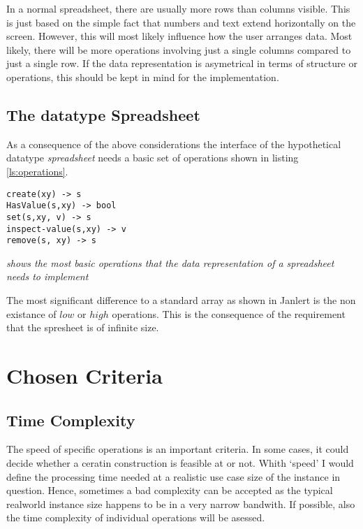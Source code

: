 \documentclass[a4paper,11pt,twoside]{article}
\begin{document}
In a normal spreadsheet, there are usually more rows than columns
visible. This is just based on the simple fact that numbers and text
extend horizontally on the screen. However, this will most likely
influence how the user arranges data. Most likely, there will be more
operations involving just a single columns compared to just a single
row. If the data representation is asymetrical in terms of structure
or operations, this should be kept in mind for the implementation. 

\subsection{The datatype Spreadsheet}
As a consequence of the above considerations the interface of the
hypothetical datatype \textit{spreadsheet} needs a basic set of
operations shown in listing \ref{ls:operations}. 

\begin{listing}
\begin{verbatim}
create(xy) -> s
HasValue(s,xy) -> bool
set(s,xy, v) -> s
inspect-value(s,xy) -> v
remove(s, xy) -> s
\end{verbatim}
\caption{\textit{shows the most basic operations that the data
  representation of a spreadsheet needs to implement \label{ls:operations}}}
\end{listing}

The most significant difference to a standard array as shown in
Janlert \cite[pp. 92-95]{janlert2000} is the non existance of $low$ or
$high$ operations. This is the consequence of the requirement that the
spresheet is of infinite size. 




\section{Chosen Criteria}
\subsection{Time Complexity}
The speed of specific operations is an important criteria. In some
cases, it could decide whether a ceratin construction is feasible at
or not. Whith `speed' I would define the processing time needed at a
realistic use case size of the instance in question. Hence, sometimes
a bad complexity can be accepted as the typical realworld instance
size happens to be in a very narrow bandwith. If possible, also the
time complexity of individual operations will be asessed.    
\end{document}
